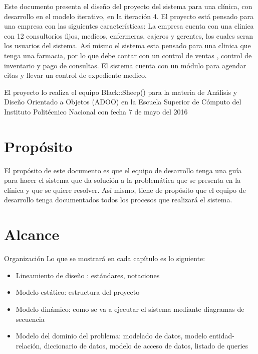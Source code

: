 Este documento presenta el diseño del proyecto del sistema para una clínica, con desarrollo en el modelo iterativo, en la iteración 4. El proyecto está pensado para una empresa con las siguientes características:
La empresa cuenta con una clinica con 12 consultorios fijos, medicos, enfermeras, cajeros y gerentes, los cuales seran los usuarios del sistema. Así mismo el sistema esta pensado para una clinica que tenga una farmacia, por lo que debe contar con un control de ventas , control de inventario y pago de consultas. El sistema cuenta con un módulo para agendar citas y llevar un control de expediente medico.

El proyecto lo realiza el equipo Black::Sheep() para la materia de Análisis y Diseño Orientado a Objetos (ADOO) en la Escuela Superior de Cómputo del Instituto Politécnico Nacional con fecha 7 de mayo del 2016


\section{Propósito}
El propósito de este documento es que el equipo de desarrollo tenga una guía para hacer el sistema que da solución a la problemática que se presenta en la clínica y que se quiere resolver. Así mismo,  tiene de propósito que  el equipo de desarrollo tenga documentados todos los procesos que realizará el sistema.
\section{Alcance}

Organización
Lo que se mostrará en cada capítulo es lo siguiente:
\begin{itemize}
\item Lineamiento de diseño : estándares, notaciones

\item Modelo estático: estructura del proyecto

\item Modelo dinámico: como se va a ejecutar el sistema mediante diagramas de secuencia

\item Modelo del dominio del problema: modelado de datos, modelo entidad-relación, diccionario de datos, modelo de acceso de datos, listado de queries

\end{itemize}

